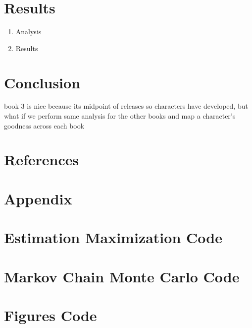 \documentclass{article}
\begin{document}
\section{Results} \label{Results}
\begin{enumerate}
    \item Analysis
    \item Results
\end{enumerate}


\section{Conclusion} \label{Conclusion}

book 3 is nice because its midpoint of releases so characters have developed, but what if we perform same analysis for the other books and map a character's goodness across each book

\section{References}
\printbibliography

\section*{Appendix}
\appendix 

\section{Estimation Maximization Code}
\section{Markov Chain Monte Carlo Code}
\section{Figures Code}
\end{document}

